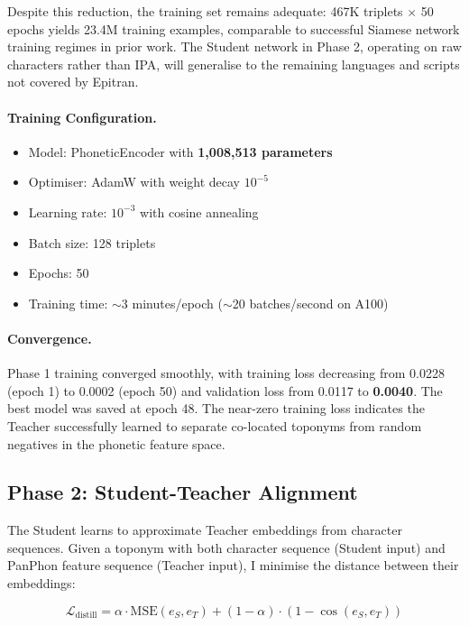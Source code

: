 \documentclass[11pt,a4paper]{article}
\begin{document}
Despite this reduction, the training set remains adequate: 467K triplets $\times$ 50 epochs yields 23.4M training examples, comparable to successful Siamese network training regimes in prior work. The Student network in Phase 2, operating on raw characters rather than IPA, will generalise to the remaining languages and scripts not covered by Epitran.

\paragraph{Training Configuration.}
\begin{itemize}
    \item Model: PhoneticEncoder with \textbf{1,008,513 parameters}
    \item Optimiser: AdamW with weight decay $10^{-5}$
    \item Learning rate: $10^{-3}$ with cosine annealing
    \item Batch size: 128 triplets
    \item Epochs: 50
    \item Training time: $\sim$3 minutes/epoch ($\sim$20 batches/second on A100)
\end{itemize}

\paragraph{Convergence.} Phase 1 training converged smoothly, with training loss decreasing from 0.0228 (epoch 1) to 0.0002 (epoch 50) and validation loss from 0.0117 to \textbf{0.0040}. The best model was saved at epoch 48. The near-zero training loss indicates the Teacher successfully learned to separate co-located toponyms from random negatives in the phonetic feature space.

\subsection{Phase 2: Student-Teacher Alignment}

The Student learns to approximate Teacher embeddings from character sequences. Given a toponym with both character sequence (Student input) and PanPhon feature sequence (Teacher input), I minimise the distance between their embeddings:

\begin{equation}
\mathcal{L}_{\text{distill}} = \alpha \cdot \text{MSE}(e_S, e_T) + (1 - \alpha) \cdot (1 - \cos(e_S, e_T))
\end{equation}
\end{document}
